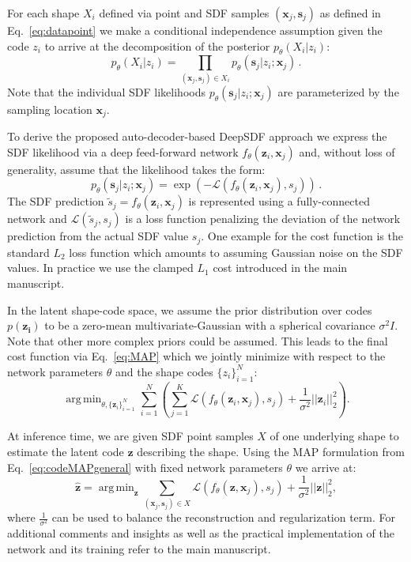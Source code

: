 \documentclass[10pt,twocolumn,letterpaper]{article}
\DeclareMathOperator*{\argmin}{arg\,min}
\newcommand\jj[1]{\textcolor{blue}{\textbf{#1}}}
\begin{document}
For each shape $X_i$ defined via point and SDF samples $(\bm{x}_j,\bm{s}_j)$ as defined in 
Eq.~\ref{eq:datapoint} we make a conditional independence assumption given the code $z_i$ to arrive at the decomposition of the posterior $ p_{\theta}(X_i|z_i)$:
\begin{equation} 
p_{\theta}(X_i | z_i)=\prod_{(\bm{x}_j,\bm{s}_j)\in X_i}p_{\theta}(\bm{s}_j | z_i; \bm{x}_j)\,.
\end{equation} 
Note that the individual SDF likelihoods $p_{\theta}(\bm{s}_j | z_i; \bm{x}_j)$ are parameterized by the sampling location $\bm{x}_j$.

To derive the proposed auto-decoder-based DeepSDF approach we express the SDF likelihood via a deep feed-forward network $f_\theta(\bm{z}_i,\bm{x}_j)$ and, without loss of generality, assume that the likelihood takes the form:
\begin{equation}
   p_{\theta}(\bm{s}_j | z_i; \bm{x}_j) = \exp(-\mathcal{L}(f_\theta (\bm{z}_i,\bm{x}_j),s_j)) \,.
\end{equation}
The SDF prediction $\tilde{s}_j = f_\theta (\bm{z}_i,\bm{x}_j)$ is represented using a fully-connected network and $\mathcal{L}(\tilde{s}_j, s_j)$ is a loss function penalizing the deviation of the network prediction from the actual SDF value $s_j$. One example for the cost function is the standard $L_2$ loss function which amounts to assuming Gaussian noise on the SDF values. In practice we use the clamped $L_1$ cost introduced in the main manuscript.

In the latent shape-code space, we assume the prior distribution over codes $p(\bm{z_i})$ to be a zero-mean multivariate-Gaussian with a spherical covariance $\sigma^2 I$. 
Note that other more complex priors could be assumed.
%
This leads to the final cost function via Eq.~\ref{eq:MAP} which we jointly minimize with respect to the network parameters $\theta$ and the shape codes $\{z_i\}_{i=1}^N$:
\begin{equation} \label{eq:objective}
\argmin_{\theta, \{\bm{z}_i\}_{i=1}^N} \sum_{i=1}^N \left( \sum_{j=1}^K \mathcal{L}(f_\theta (\bm{z}_i,\bm{x}_j),s_j)+\frac{1}{\sigma^{2}}||\bm{z}_i ||_2^2 \right).
\end{equation}



At inference time, we are given SDF point samples $X$ of one underlying shape to estimate the latent code $\bm{z}$ describing the shape. Using the MAP formulation from Eq.~\ref{eq:codeMAPgeneral} with fixed network parameters $\theta$ we arrive at:
 \begin{equation} \label{eq:testtime2}
\hat{\bm{z}}= \argmin_{\bm{z}} \sum_{(\bm{x}_j,\bm{s}_j)\in X} \mathcal{L}(f_\theta (\bm{z},\bm{x}_j),s_j)+\frac{1}{\sigma^{2}}||\bm{z}||_2^2,
\end{equation}
where $\frac{1}{\sigma^2}$ can be used to balance the reconstruction and regularization term.
For additional comments and insights as well as the practical implementation of the network and its training refer to the main manuscript.
\end{document}
